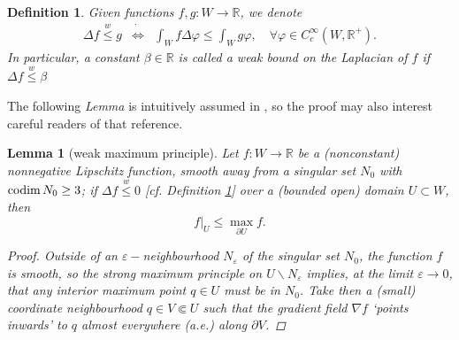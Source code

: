 \documentclass{article}
\newcommand{\func}[1]{\textnormal {#1\,}}
\newcommand{\R}{\mathbb{R}}
\newcommand{\wleq}{\overset{w}{\leq}}
\newtheorem{definition}[theorem]{Definition}
\newtheorem{lemma}[theorem]{Lemma}
\begin{document}
\begin{definition}      \label{def weak bound on Laplacian}
Given functions $f,g:W\rightarrow \R$, we denote
\begin{eqnarray*}
        \Delta f \wleq g 
        &\dot\Leftrightarrow&
        \int_W f\Delta\varphi \leq \int_W g\varphi ,
        \quad \forall \varphi\in C_c^\infty (W,\R^+).
\end{eqnarray*} 
In particular, a constant $\beta\in\R$ is called a \emph{weak bound on the Laplacian of $f$} if $\Delta f \wleq\beta$
\end{definition}
The following \emph{Lemma} is intuitively assumed in  \cite[p.246]{inf dets stab bdls...}, so the proof may also interest careful readers of that reference.
\begin{lemma}[weak maximum principle]   
\label{lemma weak max principle}
Let $f:W\to\R$ be a (nonconstant) nonnegative Lipschitz function, smooth away from a singular set $N_0$ with $\func{codim} N_0\geq3$; if $\Delta f\wleq 0$ [cf. \emph{Definition \ref{def weak bound on Laplacian}}] over a (bounded open) domain $U\subset W$, then $$\left. f \right\vert_{U}\leq \max\limits_{\partial U} f.$$

\begin{proof}
Outside of an  $\varepsilon-$neighbourhood $N_\varepsilon$ of the singular set $N_0$, the function $f$ is smooth, so the strong maximum principle on $U\smallsetminus N_\varepsilon$ implies, at the limit $\varepsilon\to0$, that any interior maximum point $q\in U$ must be in $N_0$.
Take then a (small) coordinate neighbourhood $q\in V\Subset U$ such that the gradient field $\nabla f$ `points inwards' to $q$ almost everywhere (a.e.) along $\partial V$. 


\end{proof}
\end{lemma}
\end{document}

